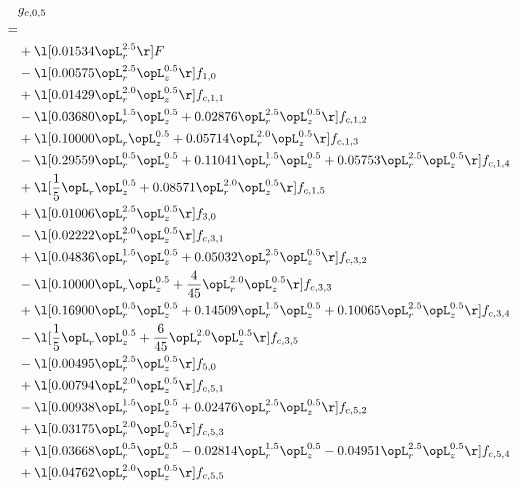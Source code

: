 \begin{alignat}{2} 
\label{eq:g_05_0} 
& g_{c,0,5} \nonumber \\ 
 = \\ 
& + \l[  0.01534 \opL_r^{2.5}  \r] F \nonumber \\ 
& - \l[  0.00575 \opL_r^{2.5} \opL_z^{0.5}  \r] f_{1,0} \nonumber \\ 
& + \l[  0.01429 \opL_r^{2.0} \opL_z^{0.5}  \r] f_{c,1,1} \nonumber \\ 
& - \l[  0.03680 \opL_r^{1.5} \opL_z^{0.5} +  0.02876 \opL_r^{2.5} \opL_z^{0.5}  \r] f_{c,1,2} \nonumber \\ 
& + \l[  0.10000 \opL_r \opL_z^{0.5} +  0.05714 \opL_r^{2.0} \opL_z^{0.5}  \r] f_{c,1,3} \nonumber \\ 
& - \l[  0.29559 \opL_r^{0.5} \opL_z^{0.5} +  0.11041 \opL_r^{1.5} \opL_z^{0.5} +  0.05753 \opL_r^{2.5} \opL_z^{0.5}  \r] f_{c,1,4} \nonumber \\ 
& + \l[ \frac{1}{5} \opL_r \opL_z^{0.5} +  0.08571 \opL_r^{2.0} \opL_z^{0.5}  \r] f_{c,1,5} \nonumber \\ 
& + \l[  0.01006 \opL_r^{2.5} \opL_z^{0.5}  \r] f_{3,0} \nonumber \\ 
& - \l[  0.02222 \opL_r^{2.0} \opL_z^{0.5}  \r] f_{c,3,1} \nonumber \\ 
& + \l[  0.04836 \opL_r^{1.5} \opL_z^{0.5} +  0.05032 \opL_r^{2.5} \opL_z^{0.5}  \r] f_{c,3,2} \nonumber \\ 
& - \l[  0.10000 \opL_r \opL_z^{0.5} + \frac{4}{45} \opL_r^{2.0} \opL_z^{0.5}  \r] f_{c,3,3} \nonumber \\ 
& + \l[  0.16900 \opL_r^{0.5} \opL_z^{0.5} +  0.14509 \opL_r^{1.5} \opL_z^{0.5} +  0.10065 \opL_r^{2.5} \opL_z^{0.5}  \r] f_{c,3,4} \nonumber \\ 
& - \l[ \frac{1}{5} \opL_r \opL_z^{0.5} + \frac{6}{45} \opL_r^{2.0} \opL_z^{0.5}  \r] f_{c,3,5} \nonumber \\ 
& - \l[  0.00495 \opL_r^{2.5} \opL_z^{0.5}  \r] f_{5,0} \nonumber \\ 
& + \l[  0.00794 \opL_r^{2.0} \opL_z^{0.5}  \r] f_{c,5,1} \nonumber \\ 
& - \l[  0.00938 \opL_r^{1.5} \opL_z^{0.5} +  0.02476 \opL_r^{2.5} \opL_z^{0.5}  \r] f_{c,5,2} \nonumber \\ 
& + \l[  0.03175 \opL_r^{2.0} \opL_z^{0.5}  \r] f_{c,5,3} \nonumber \\ 
& + \l[  0.03668 \opL_r^{0.5} \opL_z^{0.5}   -0.02814 \opL_r^{1.5} \opL_z^{0.5}   -0.04951 \opL_r^{2.5} \opL_z^{0.5}  \r] f_{c,5,4} \nonumber \\ 
& + \l[  0.04762 \opL_r^{2.0} \opL_z^{0.5}  \r] f_{c,5,5} \nonumber \\ 
\end{alignat} 


